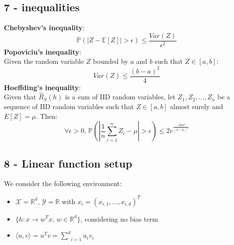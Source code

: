 \documentclass{homework}
\begin{document}
\subsection*{7 - inequalities}
\textbf{Chebyshev's inequality}:
$$\mathbb{P}(|Z-\mathbb{E}[Z]|>\epsilon)\le\frac{Var(Z)}{\epsilon^2}$$
\textbf{Popoviciu's inequality}:\\
Given the random variable $Z$ bounded by $a$ and $b$ such that $Z\in[a,b]$:
$$Var(Z)\le\frac{(b-a)^2}{4}$$
\textbf{Hoeffding's inequality}:\\
Given that $\hat{R}_S(h)$ is a sum of IID random variables, let $Z_1, Z_2, ..., Z_n$ be a sequence of IID random variables such that $Z\in[a,b]$ almost surely and $E[Z]=\mu$. Then:
$$\forall \epsilon > 0,\, \mathbb{P}(|\frac{1}{n}\underset{i=1}{\overset{n}{\sum}}Z_i-\mu|>\epsilon)\le2e^{\frac{-2n\epsilon^2}{(b-a)^2}}$$
\subsection*{8 - Linear function setup}
We consider the following environment: 
\begin{itemize}
    \item $\mathcal{X}=\mathbb{R}^d,\,\mathcal{Y}=\mathbb{R}$ with $x_i=(x_{i,1},...,x_{i,d})^T$
    \item $\{h:x\rightarrow w^Tx,\,w\in\mathbb{R}^d\}$, considering no bias term
    \item $\langle u,v\rangle = u^Tv=\underset{i=1}{\overset{d}{\sum}}u_iv_i$
\end{itemize}

\end{document}
